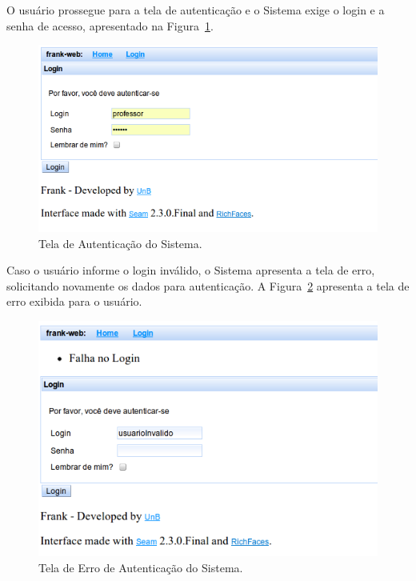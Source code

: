 O usuário prossegue para a tela de autenticação e o Sistema exige o login e a senha de acesso, apresentado na Figura~\ref{fig:frank-tela-aluno-login}. 

\begin{figure}
	\centering
	\includegraphics[scale=0.6]{images/frank-tela-aluno-login.png}
	\caption{Tela de Autenticação do Sistema.}
	\label{fig:frank-tela-aluno-login}
\end{figure}

Caso o usuário informe o login inválido, o Sistema apresenta a tela de erro, solicitando novamente os dados para autenticação. A Figura~\ref{fig:frank-tela-login-invalido} apresenta a tela de erro exibida para o usuário.

\begin{figure}
	\centering
	\includegraphics[scale=0.6]{images/frank-tela-login-invalido.png}
	\caption{Tela de Erro de Autenticação do Sistema.}
	\label{fig:frank-tela-login-invalido}
\end{figure}

